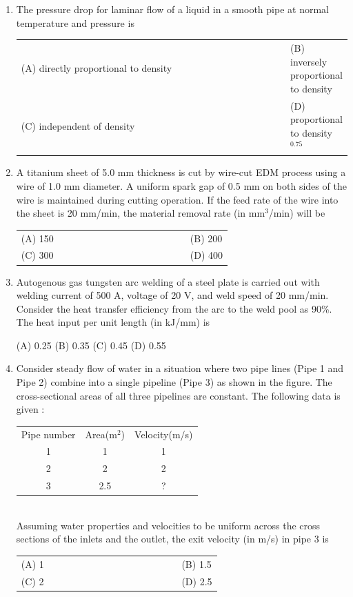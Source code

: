 \documentclass[a4paper,12pt]{article}
\begin{document}
\begin{enumerate}[label=Q.\arabic*, leftmargin=*]
\item The pressure drop for laminar flow of a liquid in a smooth pipe at normal temperature and pressure is
\begin{multicols}{2}
\begin{tabular}[t]{p{0.9\linewidth} p{0.9\linewidth}}
(A) directly proportional to density & (B) inversely proportional to density \\
(C) independent of density & (D) proportional to density\(^{0.75}\) \\
\end{tabular}
\end{multicols}

\item A titanium sheet of 5.0 mm thickness is cut by wire-cut EDM process using a wire of 1.0 mm diameter. A uniform spark gap of 0.5 mm on both sides of the wire is maintained during cutting operation. If the feed rate of the wire into the sheet is 20 mm/min, the material removal rate (in mm$^3$/min) will be
\begin{multicols}{2}
\begin{tabular}[t]{p{0.8\linewidth} p{0.9\linewidth}}
(A) 150 & (B) 200 \\
(C) 300 & (D) 400 \\
\end{tabular}
\end{multicols}

\item Autogenous gas tungsten arc welding of a steel plate is carried out with welding current of 500 A, voltage of 20 V, and weld speed of 20 mm/min. Consider the heat transfer efficiency from the arc to the weld pool as 90\%. The heat input per unit length (in kJ/mm) is

(A) 0.25 \hfill (B) 0.35 \hfill(C) 0.45 \hfill (D) 0.55 \\

\item Consider steady flow of water in a situation where two pipe lines (Pipe 1 and Pipe 2) combine into a single pipeline (Pipe 3) as shown in the figure. The cross-sectional areas of all three pipelines are constant. The following data is given : \\
\begin{tabular}{c c c}
Pipe number & Area(m$^2$) & Velocity(m/s) \\
   1  & 1 & 1 \\
   2  & 2 & 2\\
   3 & 2.5 & ? \\
   \end{tabular} \\
Assuming water properties and velocities to be uniform across the cross sections of the inlets and the outlet, the exit velocity (in m/s) in pipe 3 is
\begin{multicols}{2}
\begin{tabular}[t]{p{0.8\linewidth} p{0.9\linewidth}}
(A) 1 & (B) 1.5 \\
(C) 2 & (D) 2.5 \\
\end{tabular}
\end{multicols}


\end{enumerate}
\end{document}
